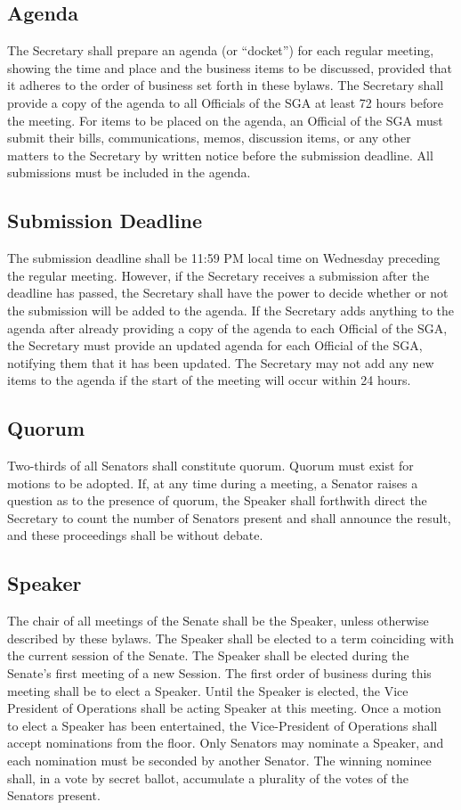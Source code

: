 \documentclass[12pt]{scrreprt}
\begin{document}
\subsection{Agenda}
The Secretary shall prepare an agenda (or “docket”) for each regular meeting, showing the time
and place and the business items to be discussed, provided that it adheres to the order of
business set forth in these bylaws. The Secretary shall provide a copy of the agenda to all
Officials of the SGA at least 72 hours before the meeting. For items to be placed on the agenda,
an Official of the SGA must submit their bills, communications, memos, discussion items, or any
other matters to the Secretary by written notice before the submission deadline. All submissions
must be included in the agenda.

\subsection{Submission Deadline}
The submission deadline shall be 11:59 PM local time on Wednesday preceding the regular meeting.
However, if the Secretary receives a submission after the deadline has passed, the Secretary
shall have the power to decide whether or not the submission will be added to the agenda. If the
Secretary adds anything to the agenda after already providing a copy of the agenda to each
Official of the SGA, the Secretary must provide an updated agenda for each Official of the SGA,
notifying them that it has been updated. The Secretary may not add any new items to the
agenda if the start of the meeting will occur within 24 hours.

\subsection{Quorum}
Two-thirds of all Senators shall constitute quorum. Quorum must exist for motions to be
adopted. If, at any time during a meeting, a Senator raises a question as to the presence of quorum, the
Speaker shall forthwith direct the Secretary to count the number of Senators present and shall
announce the result, and these proceedings shall be without debate.
\subsection{Speaker}
The chair of all meetings of the Senate shall be the Speaker, unless otherwise described by
these bylaws. The Speaker shall be elected to a term coinciding with the current session of the
Senate. The Speaker shall be elected during the Senate’s first meeting of a new Session. The
first order of business during this meeting shall be to elect a Speaker. Until the Speaker is
elected, the Vice President of Operations shall be acting Speaker at this meeting. Once a
motion to elect a Speaker has been entertained, the Vice-President of Operations shall accept
nominations from the floor. Only Senators may nominate a Speaker, and each nomination must
be seconded by another Senator. The winning nominee shall, in a vote by secret ballot,
accumulate a plurality of the votes of the Senators present.
\end{document}
